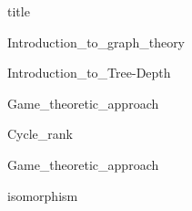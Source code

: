 \documentclass[a4paper,12pt]{article}
\begin{document}
{title}
	
{Introduction_to_graph_theory}

{Introduction_to_Tree-Depth}

{Game_theoretic_approach}

{Cycle_rank}

{Game_theoretic_approach}

{isomorphism}
\end{document}
